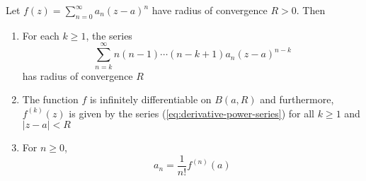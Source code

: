 \begin{theorem}
    Let $f(z) = \sum\limits_{n = 0}^\infty a_n(z - a)^n$ have radius of convergence $R > 0$. Then 
    \begin{enumerate}[label=(\alph*)]
        \item For each $k\ge 1$, the series 
        \begin{equation*}\label{eq:derivative-power-series}
            \sum_{n = k}^\infty n(n - 1)\cdots(n - k + 1)a_n(z - a)^{n - k}\tag{$\star$}
        \end{equation*}
        has radius of convergence $R$ 

        \item The function $f$ is infinitely differentiable on $B(a, R)$ and furthermore, $f^{(k)}(z)$ is given by the series (\ref{eq:derivative-power-series}) for all $k\ge 1$ and $|z - a| < R$
        
        \item For $n\ge 0$, 
        \begin{equation*}
            a_n = \frac{1}{n!}f^{(n)}(a)
        \end{equation*}
    \end{enumerate}
\end{theorem}
